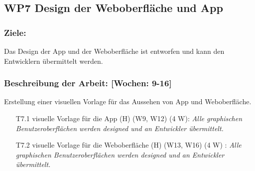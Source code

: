 \documentclass{report}
\begin{document}
\subsection*{WP7 Design der Weboberfläche und App}

\subsubsection{Ziele:} Das Design der App und der Weboberfläche ist entworfen und kann den Entwicklern übermittelt werden.
\subsubsection{Beschreibung der Arbeit: [Wochen: 9-16]} Erstellung einer visuellen Vorlage für das Aussehen von App und Weboberfläche. 

\begin{enumerate}
\item [T7.1] visuelle Vorlage für die App (H) (W9, W12) (4 W): \emph{ Alle graphischen Benutzeroberflächen werden designed und an Entwickler übermittelt.}
\item [T7.2] visuelle Vorlage für die Weboberfläche (H) (W13, W16) (4 W) : \emph{ Alle graphischen Benutzeroberflächen werden designed und an Entwickler übermittelt.}
\end{enumerate}
\end{document}
